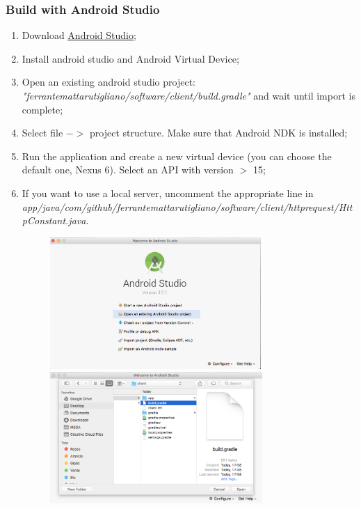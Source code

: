 \documentclass[a4paper]{article}
\begin{document}
\subsubsection{Build with Android Studio}
\begin{enumerate}
    \item Download \href{https://developer.android.com/studio/}{\underline{Android Studio}};
    \item Install android studio and Android Virtual Device;
    \item Open an existing android studio project:
    \newline\textit{"ferrantemattarutigliano/software/client/build.gradle"} and wait until import is complete;
    \item Select file ${->}$ project structure. Make sure that Android NDK is installed;
    \item Run the application and create a new virtual device (you can choose the default one, Nexus 6). Select an API with version ${>}$ 15;
    \item If you want to use a local server, uncomment the appropriate line in \newline
    \textit{app/java/com/github/ferrantemattarutigliano/software/client/httprequest/\newline HttpConstant.java}.
    \begin{figure}[!htpb]
    \centering
    \includegraphics[height=50mm]{ITD/images/android_studio1.png}
    \includegraphics[height=50mm]{ITD/images/android_studio2.png}
    \end{figure}
\end{enumerate}
\end{document}
